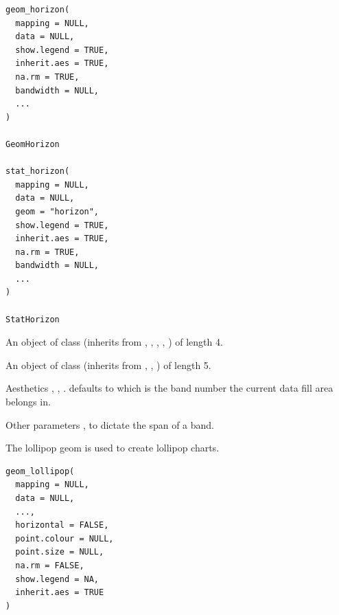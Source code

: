 \documentclass[a4paper]{book}
\begin{document}
%
\begin{Usage}
\begin{verbatim}
geom_horizon(
  mapping = NULL,
  data = NULL,
  show.legend = TRUE,
  inherit.aes = TRUE,
  na.rm = TRUE,
  bandwidth = NULL,
  ...
)

GeomHorizon

stat_horizon(
  mapping = NULL,
  data = NULL,
  geom = "horizon",
  show.legend = TRUE,
  inherit.aes = TRUE,
  na.rm = TRUE,
  bandwidth = NULL,
  ...
)

StatHorizon
\end{verbatim}
\end{Usage}
%
\begin{Format}
An object of class  (inherits from , , , , ) of length 4.

An object of class  (inherits from , , ) of length 5.
\end{Format}
%
\begin{Section}{Aesthetics}
, , .  defaults to  which is
the band number the current data fill area belongs in.
\end{Section}
%
\begin{Section}{Other parameters}
, to dictate the span of a band.
\end{Section}
%
\begin{Description}
The lollipop geom is used to create lollipop charts.
\end{Description}
%
\begin{Usage}
\begin{verbatim}
geom_lollipop(
  mapping = NULL,
  data = NULL,
  ...,
  horizontal = FALSE,
  point.colour = NULL,
  point.size = NULL,
  na.rm = FALSE,
  show.legend = NA,
  inherit.aes = TRUE
)
\end{verbatim}
\end{Usage}
%
\end{document}
